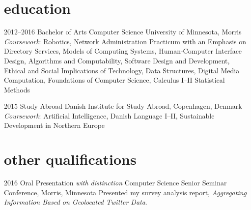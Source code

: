 \documentclass[]{cv-style} %
\begin{document}

\section{education}

\begin{entrylist}


\entry
{2012--2016}
{Bachelor of Arts {\normalfont Computer Science}}
{University of Minnesota, Morris}
{\emph{Coursework}: \footnotesize{Robotics, Network Administration Practicum with an Emphasis on Directory Services, Models of Computing Systems, Human-Computer Interface Design, Algorithms and Computability, Software Design and Development, Ethical and Social Implications of Technology, Data Structures, Digital Media Computation, Foundations of Computer Science, Calculus I--II Statistical Methods}}

\entry
{2015}
{Study Abroad}
{Danish Institute for Study Abroad, Copenhagen, Denmark}
{\emph{Coursework}: \footnotesize{Artificial Intelligence, Danish Language I--II, Sustainable Development in Northern Europe}}

\end{entrylist}


\section{other qualifications}

\begin{entrylist}


\entry
{2016}
{Oral Presentation {\normalfont \emph{with distinction}}}
{Computer Science Senior Seminar Conference, Morris, Minnesota}
{Presented my survey analysis report, \emph{Aggregating Information Based on Geolocated Twitter Data}.}


\end{entrylist}
\end{document}
